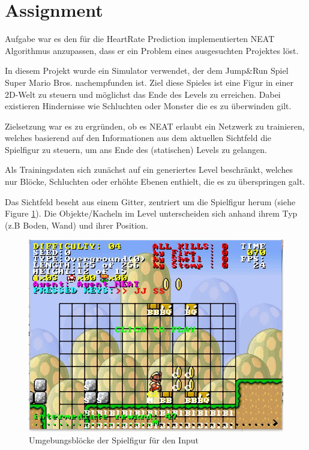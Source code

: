 \documentclass{hbrs-ecta-report}
\begin{document}
\FloatBarrier
\newpage
\newpage
\section{Assignment}
Aufgabe war es den für die HeartRate Prediction implementierten NEAT Algorithmus\cite{Stanley2002a} anzupassen, dass er ein Problem eines ausgesuchten Projektes löst.

In diesem Projekt wurde ein Simulator verwendet, der dem Jump\&Run Spiel Super Mario Bros. nachempfunden ist.
Ziel diese Spieles ist eine Figur in einer 2D-Welt zu steuern und möglichst das Ende des Levels zu erreichen. Dabei existieren Hindernisse wie Schluchten oder Monster die es zu überwinden gilt. 

Zielsetzung war es zu ergründen, ob es NEAT erlaubt ein Netzwerk zu trainieren, welches basierend auf den Informationen aus dem aktuellen Sichtfeld die Spielfigur zu steuern, um ans Ende des (statischen) Levels zu gelangen.

Als Trainingsdaten sich zunächst auf ein generiertes Level beschränkt, welches nur Blöcke, Schluchten oder erhöhte Ebenen enthielt, die es zu überspringen galt.

Das Sichtfeld beseht aus einem Gitter, zentriert um die Spielfigur herum (siehe Figure \ref{fig:MarioInput}). Die Objekte/Kacheln im Level unterscheiden sich anhand ihrem Typ (z.B Boden, Wand) und ihrer Position.

\begin{figure}[h!]
	\centering
	\includegraphics[width=\linewidth]{img/MarioInput.jpg}
	\caption{Umgebungsblöcke der Spielfigur für den Input}
	\label{fig:MarioInput} 
\end{figure}
\end{document}
